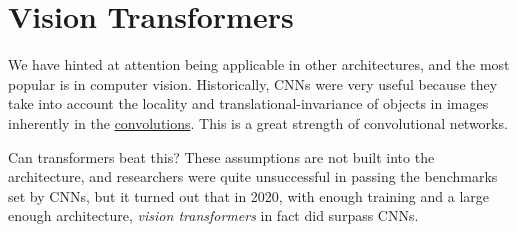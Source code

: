 \section{Vision Transformers} 

  We have hinted at attention being applicable in other architectures, and the most popular is in computer vision. Historically, CNNs were very useful because they take into account the locality and translational-invariance of objects in images inherently in the \hyperref[prob-def:convolution]{convolutions}. This is a great strength of convolutional networks. 
  
  Can transformers beat this? These assumptions are not built into the architecture, and researchers were quite unsuccessful in passing the benchmarks set by CNNs, but it turned out that in 2020, with enough training and a large enough architecture, \textit{vision transformers} in fact did surpass CNNs. 

